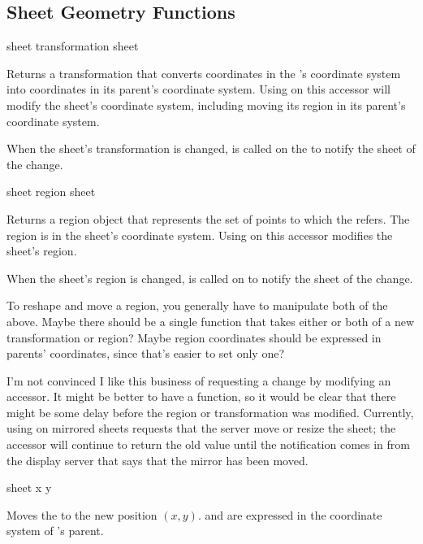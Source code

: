 \subsection {Sheet Geometry Functions}

 {sheet}
 {transformation sheet}

Returns a transformation that converts coordinates in the 
's coordinate system into coordinates in its parent's coordinate
system.  Using  on this accessor will modify the sheet's coordinate
system, including moving its region in its parent's coordinate system.

When the sheet's transformation is changed,
 is called on the  to notify the sheet of
the change.

 {sheet}
 {region sheet}

Returns a region object that represents the set of points to which the
  refers.  The region is in the sheet's coordinate
system.  Using  on this accessor modifies the sheet's region.

When the sheet's region is changed,  is called on
 to notify the sheet of the change.

 {To reshape and move a region, you generally have to manipulate
both of the above.  Maybe there should be a single function that takes either
or both of a new transformation or region?  Maybe region coordinates should be
expressed in parents' coordinates, since that's easier to set only one?}

 {I'm not convinced I like this business of requesting a change by
modifying an accessor.  It might be better to have a  function, so
it would be clear that there might be some delay before the region or
transformation was modified.  Currently, using  on mirrored sheets
requests that the server move or resize the sheet; the accessor will continue to
return the old value until the notification comes in from the display server
that says that the mirror has been moved.}


 {sheet x y}

Moves the   to the new position $(x,y)$.   and
 are expressed in the coordinate system of 's parent.

